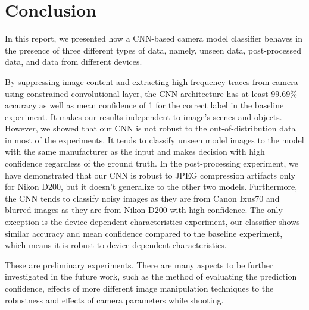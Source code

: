 \documentclass[a4paper, 9pt, twocolumn]{extarticle}
\begin{document}
\section{Conclusion}
\label{section:conclusion}

In this report, we presented how a CNN-based camera model classifier behaves in the presence of three different types of data, namely, unseen data, post-processed data, and data from different devices.

By suppressing image content and extracting high frequency traces from camera using constrained convolutional layer, the CNN architecture has at least 99.69\% accuracy as well as mean confidence of 1 for the correct label in the baseline experiment. It makes our results independent to image's scenes and objects. However, we showed that our CNN is not robust to the out-of-distribution data in most of the experiments. It tends to classify unseen model images to the model with the same manufacturer as the input and makes decision with high confidence regardless of the ground truth. In the post-processing experiment, we have demonstrated that our CNN is robust to JPEG compression artifacts only for Nikon D200, but it doesn't generalize to the other two models. Furthermore, the CNN tends to classify noisy images as they are from Canon Ixus70 and blurred images as they are from Nikon D200 with high confidence. The only exception is the device-dependent characteristics experiment, our classifier shows similar accuracy and mean confidence compared to the baseline experiment, which means it is robust to device-dependent characteristics.

These are preliminary experiments. There are many aspects to be further investigated in the future work, such as the method of evaluating the prediction confidence, effects of more different image manipulation techniques to the robustness and effects of camera parameters while shooting.	

%

\small

\end{document}
